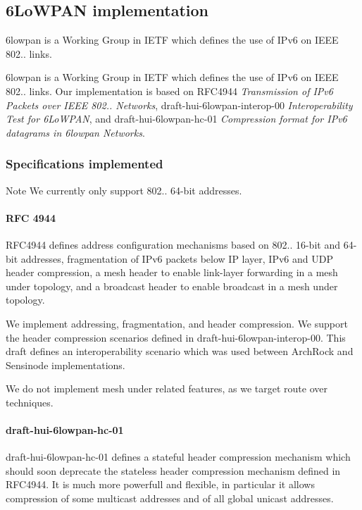 \hypertarget{a00056}{\subsection{6\-Lo\-W\-P\-A\-N implementation}
\label{a00056}
}


6lowpan is a \-Working \-Group in \-I\-E\-T\-F which defines the use of \-I\-Pv6 on \-I\-E\-E\-E 802.. links.  


6lowpan is a \-Working \-Group in \-I\-E\-T\-F which defines the use of \-I\-Pv6 on \-I\-E\-E\-E 802.. links. \-Our implementation is based on \-R\-F\-C4944 {\itshape \-Transmission of \-I\-Pv6 \-Packets over \-I\-E\-E\-E 802.. \-Networks\/}, draft-\/hui-\/6lowpan-\/interop-\/00 {\itshape \-Interoperability \-Test for 6\-Lo\-W\-P\-A\-N\/}, and draft-\/hui-\/6lowpan-\/hc-\/01 {\itshape \-Compression format for \-I\-Pv6 datagrams in 6lowpan \-Networks\/}.



\hypertarget{a00056_drafts}{}\subsubsection{\-Specifications implemented}\label{a00056_drafts}
\begin{DoxyNote}{\-Note}
\-We currently only support 802.. 64-\/bit addresses.
\end{DoxyNote}
\hypertarget{a00056_rfc4944}{}\paragraph{\-R\-F\-C 4944}\label{a00056_rfc4944}
\-R\-F\-C4944 defines address configuration mechanisms based on 802.. 16-\/bit and 64-\/bit addresses, fragmentation of \-I\-Pv6 packets below \-I\-P layer, \-I\-Pv6 and \-U\-D\-P header compression, a mesh header to enable link-\/layer forwarding in a mesh under topology, and a broadcast header to enable broadcast in a mesh under topology.

\-We implement addressing, fragmentation, and header compression. \-We support the header compression scenarios defined in draft-\/hui-\/6lowpan-\/interop-\/00. \-This draft defines an interoperability scenario which was used between \-Arch\-Rock and \-Sensinode implementations.

\-We do not implement mesh under related features, as we target route over techniques.\hypertarget{a00056_hc01}{}\paragraph{draft-\/hui-\/6lowpan-\/hc-\/01}\label{a00056_hc01}
draft-\/hui-\/6lowpan-\/hc-\/01 defines a stateful header compression mechanism which should soon deprecate the stateless header compression mechanism defined in \-R\-F\-C4944. \-It is much more powerfull and flexible, in particular it allows compression of some multicast addresses and of all global unicast addresses.



